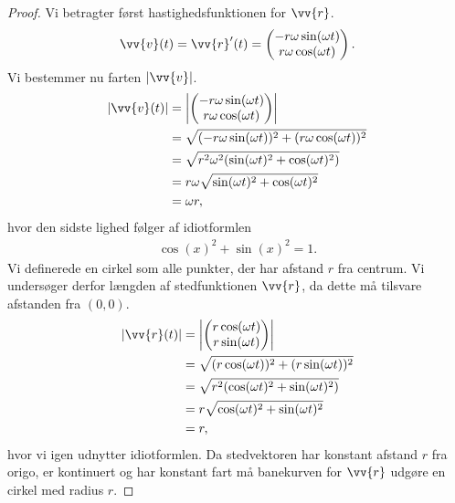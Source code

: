 \begin{proof}
	Vi betragter først hastighedsfunktionen for $\vv{r}$.
	\begin{align*}
		\vv{v}(t) = \vv{r}'(t) = 
		\begin{pmatrix}
			-r \omega \sin(\omega t) \\
			r \omega \cos(\omega t)
		\end{pmatrix}.
	\end{align*}
	Vi bestemmer nu farten $|\vv{v}|$.
	\begin{align*}
		|\vv{v}(t)| &= \left|
		\begin{pmatrix}
			-r\omega \sin(\omega t) \\	
			r \omega \cos( \omega t)
		\end{pmatrix}				
		\right| \\
		&= \sqrt{(-r\omega \sin(\omega t))^2 + (r \omega\cos(\omega t))^2} \\
		&= \sqrt{r^2\omega^2(\sin(\omega t)^2+\cos(\omega t)^2)}\\
		&= r\omega \sqrt{\sin(\omega t)^2 + \cos(\omega t )^2}\\
		&= \omega r,
	\end{align*}
	hvor den sidste lighed følger af idiotformlen
	\begin{align*}
		\cos(x)^2 + \sin(x)^2 = 1.
	\end{align*}
	Vi definerede en cirkel som alle punkter, der har afstand $r$ fra centrum. Vi undersøger derfor længden af stedfunktionen $\vv{r}$, da dette må tilsvare afstanden fra 
	$(0,0)$. 
	\begin{align*}
		|\vv{r}(t)| &= 
		\left| 
		\begin{pmatrix}
			r\cos(\omega t) \\
			r\sin(\omega t)		
		\end{pmatrix}
		\right| \\
		&= \sqrt{(r\cos(\omega t))^2 + (r\sin(\omega t))^2} \\
		&= \sqrt{r^2(\cos(\omega t)^2 + \sin(\omega t)^2)} \\
		&= r\sqrt{\cos(\omega t)^2 + \sin(\omega t)^2} \\
		&= r,
	\end{align*}
	hvor vi igen udnytter idiotformlen. Da stedvektoren har konstant afstand $r$ fra origo, er kontinuert og har konstant fart må banekurven for $\vv{r}$ udgøre en cirkel med 
	radius $r$.
\end{proof}


